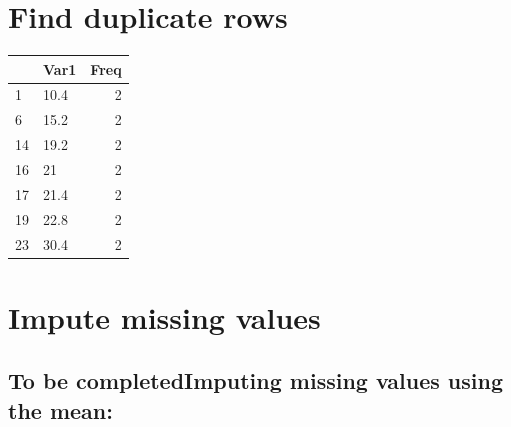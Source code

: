 \documentclass[
]{book}
\newenvironment{Shaded}{\begin{snugshade}}{\end{snugshade}}
\newcommand{\AttributeTok}[1]{\textcolor[rgb]{0.77,0.63,0.00}{#1}}
\newcommand{\CommentTok}[1]{\textcolor[rgb]{0.56,0.35,0.01}{\textit{#1}}}
\newcommand{\DecValTok}[1]{\textcolor[rgb]{0.00,0.00,0.81}{#1}}
\newcommand{\FunctionTok}[1]{\textcolor[rgb]{0.00,0.00,0.00}{#1}}
\newcommand{\NormalTok}[1]{#1}
\newcommand{\OtherTok}[1]{\textcolor[rgb]{0.56,0.35,0.01}{#1}}
\newcommand{\SpecialCharTok}[1]{\textcolor[rgb]{0.00,0.00,0.00}{#1}}
\begin{document}
\hypertarget{find-duplicate-rows}{%
\section{Find duplicate rows}\label{find-duplicate-rows}}

\begin{Shaded}
\end{Shaded}

\begin{table}
\centering
\begin{tabular}{l|l|r}
\hline
  & Var1 & Freq\\
\hline
1 & 10.4 & 2\\
\hline
6 & 15.2 & 2\\
\hline
14 & 19.2 & 2\\
\hline
16 & 21 & 2\\
\hline
17 & 21.4 & 2\\
\hline
19 & 22.8 & 2\\
\hline
23 & 30.4 & 2\\
\hline
\end{tabular}
\end{table}

\hypertarget{impute-missing-values}{%
\section{Impute missing values}\label{impute-missing-values}}

\hypertarget{to-be-completedimputing-missing-values-using-the-mean}{%
\subsection{To be completedImputing missing values using the mean:}\label{to-be-completedimputing-missing-values-using-the-mean}}
\end{document}

